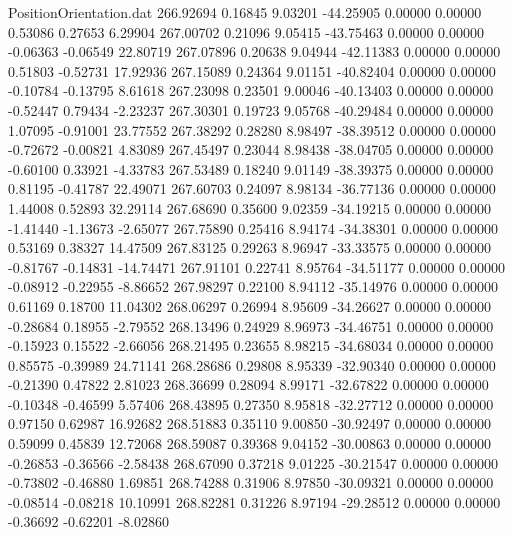 \begin{filecontents}{PositionOrientation.dat}
 266.92694    0.16845    9.03201   -44.25905    0.00000    0.00000    0.53086    0.27653    6.29904
 267.00702    0.21096    9.05415   -43.75463    0.00000    0.00000   -0.06363   -0.06549   22.80719
 267.07896    0.20638    9.04944   -42.11383    0.00000    0.00000    0.51803   -0.52731   17.92936
 267.15089    0.24364    9.01151   -40.82404    0.00000    0.00000   -0.10784   -0.13795    8.61618
 267.23098    0.23501    9.00046   -40.13403    0.00000    0.00000   -0.52447    0.79434   -2.23237
 267.30301    0.19723    9.05768   -40.29484    0.00000    0.00000    1.07095   -0.91001   23.77552
 267.38292    0.28280    8.98497   -38.39512    0.00000    0.00000   -0.72672   -0.00821    4.83089
 267.45497    0.23044    8.98438   -38.04705    0.00000    0.00000   -0.60100    0.33921   -4.33783
 267.53489    0.18240    9.01149   -38.39375    0.00000    0.00000    0.81195   -0.41787   22.49071
 267.60703    0.24097    8.98134   -36.77136    0.00000    0.00000    1.44008    0.52893   32.29114
 267.68690    0.35600    9.02359   -34.19215    0.00000    0.00000   -1.41440   -1.13673   -2.65077
 267.75890    0.25416    8.94174   -34.38301    0.00000    0.00000    0.53169    0.38327   14.47509
 267.83125    0.29263    8.96947   -33.33575    0.00000    0.00000   -0.81767   -0.14831  -14.74471
 267.91101    0.22741    8.95764   -34.51177    0.00000    0.00000   -0.08912   -0.22955   -8.86652
 267.98297    0.22100    8.94112   -35.14976    0.00000    0.00000    0.61169    0.18700   11.04302
 268.06297    0.26994    8.95609   -34.26627    0.00000    0.00000   -0.28684    0.18955   -2.79552
 268.13496    0.24929    8.96973   -34.46751    0.00000    0.00000   -0.15923    0.15522   -2.66056
 268.21495    0.23655    8.98215   -34.68034    0.00000    0.00000    0.85575   -0.39989   24.71141
 268.28686    0.29808    8.95339   -32.90340    0.00000    0.00000   -0.21390    0.47822    2.81023
 268.36699    0.28094    8.99171   -32.67822    0.00000    0.00000   -0.10348   -0.46599    5.57406
 268.43895    0.27350    8.95818   -32.27712    0.00000    0.00000    0.97150    0.62987   16.92682
 268.51883    0.35110    9.00850   -30.92497    0.00000    0.00000    0.59099    0.45839   12.72068
 268.59087    0.39368    9.04152   -30.00863    0.00000    0.00000   -0.26853   -0.36566   -2.58438
 268.67090    0.37218    9.01225   -30.21547    0.00000    0.00000   -0.73802   -0.46880    1.69851
 268.74288    0.31906    8.97850   -30.09321    0.00000    0.00000   -0.08514   -0.08218   10.10991
 268.82281    0.31226    8.97194   -29.28512    0.00000    0.00000   -0.36692   -0.62201   -8.02860

\end{filecontents}
